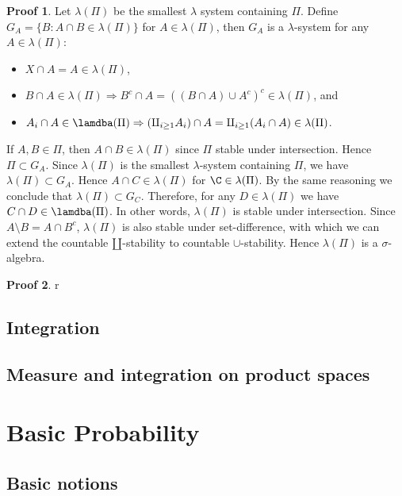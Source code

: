 \documentclass[hidelinks,11pt]{article}
\theoremstyle{definition}
\theoremstyle{dotless}
\newtheorem{prop}{Proof}[section]
\theoremstyle{remark}
\DeclareMathOperator{\1}{\mathbf{1}}
\begin{document}
\begin{prop}
Let $\lambda(\Pi)$ be the smallest $\lambda$ system containing $\Pi$. Define $G_A=\{B:A\cap B\in\lambda(\Pi)\}$ for $A\in\lambda(\Pi)$, then $G_A$ is a $\lambda$-system for any $A\in\lambda(\Pi)$:\begin{itemize}
    \item $X\cap A=A\in\lambda(\Pi)$,
    \item $B\cap A\in\lambda(\Pi)\Rightarrow B^c\cap A=((B\cap A)\cup A^c)^c\in\lambda(\Pi)$, and
    \item $A_i\cap A\in\lamdba(\Pi)\Rightarrow(\amalg_{i\geq1}A_i)\cap A=\amalg_{i\geq1}(A_i\cap A)\in\lambda(\Pi)$.
\end{itemize}
If $A,B\in\Pi$, then $A\cap B\in\lambda(\Pi)$ since $\Pi$ stable under intersection. Hence $\Pi\subset G_A$. Since $\lambda(\Pi)$ is the smallest $\lambda$-system containing $\Pi$, we have $\lambda(\Pi)\subset G_A$. Hence $A\cap C\in\lambda(\Pi)$ for $\C\in\lambda(\Pi)$. By the same reasoning we conclude that $\lambda(\Pi)\subset G_C$. Therefore, for any $D\in\lambda(\Pi)$ we have $C\cap D\in\lamdba(\Pi)$. In other words, $\lambda(\Pi)$ is stable under intersection.\medbreak
Since $A\setminus B=A\cap B^c$, $\lambda(\Pi)$ is also stable under set-difference, with which we can extend the countable $\amalg$-stability to countable $\cup$-stability. Hence $\lambda(\Pi)$ is a $\sigma$-algebra.
\end{prop}

\begin{prop}
r
\end{prop}

\subsection{Integration}

\subsection{Measure and integration on product spaces}

\section{Basic Probability}

\subsection{Basic notions}
\end{document}
